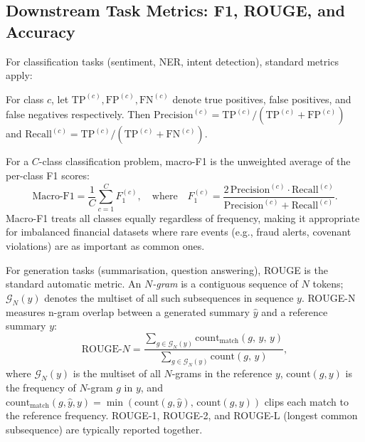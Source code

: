 \begin{deepdive}
\subsection{Downstream Task Metrics: F1, ROUGE, and Accuracy}
\label{subsec:task-metrics}

For classification tasks (sentiment, NER, intent detection), standard metrics
apply:

For class $c$, let $\mathrm{TP}^{(c)}, \mathrm{FP}^{(c)}, \mathrm{FN}^{(c)}$ denote true positives, false positives, and false negatives respectively. Then $\mathrm{Precision}^{(c)} = \mathrm{TP}^{(c)}/(\mathrm{TP}^{(c)}+\mathrm{FP}^{(c)})$ and $\mathrm{Recall}^{(c)} = \mathrm{TP}^{(c)}/(\mathrm{TP}^{(c)}+\mathrm{FN}^{(c)})$.

\begin{definition}[Macro-F1]
\label{def:macro-f1}
For a $C$-class classification problem, macro-F1 is the unweighted average of
the per-class F1 scores:
\begin{equation}
  \text{Macro-F1} = \frac{1}{C} \sum_{c=1}^{C} F_1^{(c)},
  \quad \text{where} \quad
  F_1^{(c)} = \frac{2 \, \text{Precision}^{(c)} \cdot \text{Recall}^{(c)}}
                   {\text{Precision}^{(c)} + \text{Recall}^{(c)}}.
  \label{eq:macro-f1}
\end{equation}
Macro-F1 treats all classes equally regardless of frequency, making it
appropriate for imbalanced financial datasets where rare events (e.g., fraud
alerts, covenant violations) are as important as common ones.
\end{definition}

For generation tasks (summarisation, question answering), ROUGE is the
standard automatic metric.  An \emph{$N$-gram} is a contiguous sequence of $N$ tokens; $\mathcal{G}_N(y)$ denotes the multiset of all such subsequences in sequence $y$.  ROUGE-N measures n-gram overlap between a generated
summary $\hat{y}$ and a reference summary $y$:
\begin{equation}
  \mathrm{ROUGE}\text{-}N = \frac{\displaystyle\sum_{g \in \mathcal{G}_N(y)} \mathrm{count}_{\mathrm{match}}(g,\, \hat{y},\, y)}
                                  {\displaystyle\sum_{g \in \mathcal{G}_N(y)} \mathrm{count}(g,\, y)},
  \label{eq:rouge}
\end{equation}
where $\mathcal{G}_N(y)$ is the multiset of all $N$-grams in the reference $y$,
$\mathrm{count}(g, y)$ is the frequency of $N$-gram $g$ in $y$, and
$\mathrm{count}_{\mathrm{match}}(g, \hat{y}, y) = \min(\mathrm{count}(g, \hat{y}),\, \mathrm{count}(g, y))$
clips each match to the reference frequency.
ROUGE-1, ROUGE-2, and ROUGE-L (longest common
subsequence) are typically reported together.


\end{deepdive}
